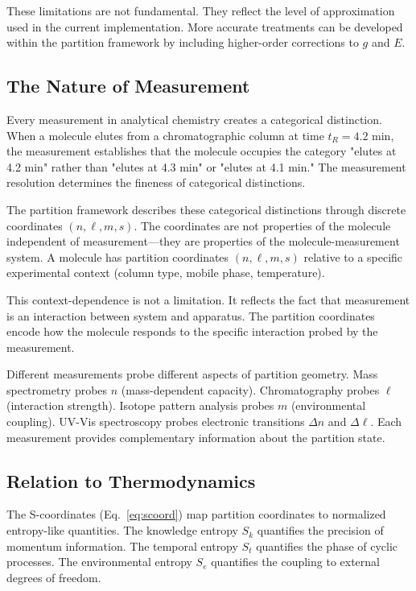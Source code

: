 \documentclass[twocolumn,superscriptaddress,prb,10pt]{revtex4-2}
\begin{document}
These limitations are not fundamental. They reflect the level of approximation used in the current implementation. More accurate treatments can be developed within the partition framework by including higher-order corrections to $g$ and $E$.

\subsection{The Nature of Measurement}

Every measurement in analytical chemistry creates a categorical distinction. When a molecule elutes from a chromatographic column at time $t_R = 4.2$ min, the measurement establishes that the molecule occupies the category "elutes at 4.2 min" rather than "elutes at 4.3 min" or "elutes at 4.1 min." The measurement resolution determines the fineness of categorical distinctions.

The partition framework describes these categorical distinctions through discrete coordinates $(n, \ell, m, s)$. The coordinates are not properties of the molecule independent of measurement—they are properties of the molecule-measurement system. A molecule has partition coordinates $(n, \ell, m, s)$ relative to a specific experimental context (column type, mobile phase, temperature).

This context-dependence is not a limitation. It reflects the fact that measurement is an interaction between system and apparatus. The partition coordinates encode how the molecule responds to the specific interaction probed by the measurement.

Different measurements probe different aspects of partition geometry. Mass spectrometry probes $n$ (mass-dependent capacity). Chromatography probes $\ell$ (interaction strength). Isotope pattern analysis probes $m$ (environmental coupling). UV-Vis spectroscopy probes electronic transitions $\Delta n$ and $\Delta \ell$. Each measurement provides complementary information about the partition state.

\subsection{Relation to Thermodynamics}

The S-coordinates (Eq.~\ref{eq:scoord}) map partition coordinates to normalized entropy-like quantities. The knowledge entropy $S_k$ quantifies the precision of momentum information. The temporal entropy $S_t$ quantifies the phase of cyclic processes. The environmental entropy $S_e$ quantifies the coupling to external degrees of freedom.
\end{document}
